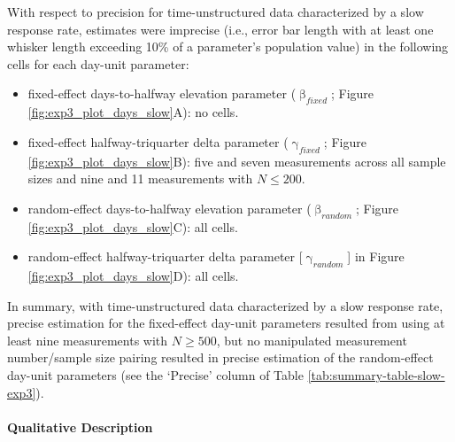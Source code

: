 \documentclass[
12pt, %
twoside,
english]{guelphthesis}
\begin{document}
With respect to precision for time-unstructured data characterized by a slow response rate, estimates were imprecise (i.e., error bar length with at least one whisker length exceeding 10\% of a parameter's population value) in the following cells for each day-unit parameter:
\begin{itemize}
\tightlist
\item
  fixed-effect days-to-halfway elevation parameter (\(\upbeta_{fixed}\); Figure \ref{fig:exp3_plot_days_slow}A): no cells.
\item
  fixed-effect halfway-triquarter delta parameter (\(\upgamma_{fixed}\); Figure \ref{fig:exp3_plot_days_slow}B): five and seven measurements across all sample sizes and nine and 11 measurements with \(N \le 200\).
\item
  random-effect days-to-halfway elevation parameter (\(\upbeta_{random}\); Figure \ref{fig:exp3_plot_days_slow}C): all cells.
\item
  random-effect halfway-triquarter delta parameter {[}\(\upgamma_{random}\){]} in Figure \ref{fig:exp3_plot_days_slow}D): all cells.
\end{itemize}
In summary, with time-unstructured data characterized by a slow response rate, precise estimation for the fixed-effect day-unit parameters resulted from using at least nine measurements with \(N \ge 500\), but no manipulated measurement number/sample size pairing resulted in precise estimation of the random-effect day-unit parameters (see the `Precise' column of Table \ref{tab:summary-table-slow-exp3}).

\hypertarget{qualitative-slow-exp3}{%
\paragraph{Qualitative Description}\label{qualitative-slow-exp3}}
\end{document}
